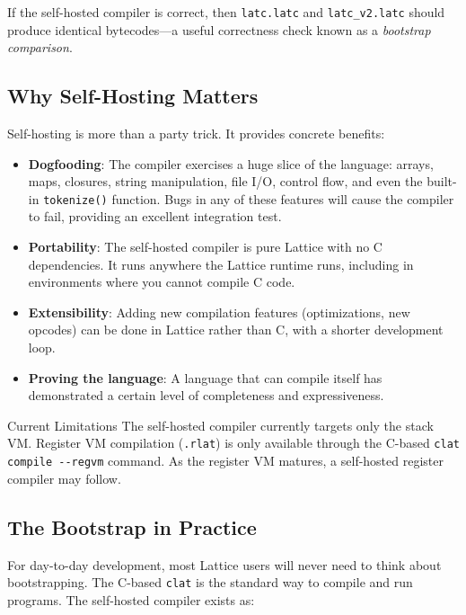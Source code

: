 If the self-hosted compiler is correct, then \lstinline|latc.latc| and \lstinline|latc_v2.latc| should produce identical bytecodes---a useful correctness check known as a \emph{bootstrap comparison}.

\subsection{Why Self-Hosting Matters}

Self-hosting is more than a party trick. It provides concrete benefits:

\begin{itemize}
  \item \textbf{Dogfooding}: The compiler exercises a huge slice of the language: arrays, maps, closures, string manipulation, file I/O, control flow, and even the built-in \lstinline|tokenize()| function. Bugs in any of these features will cause the compiler to fail, providing an excellent integration test.
  \item \textbf{Portability}: The self-hosted compiler is pure Lattice with no C dependencies. It runs anywhere the Lattice runtime runs, including in environments where you cannot compile C code.
  \item \textbf{Extensibility}: Adding new compilation features (optimizations, new opcodes) can be done in Lattice rather than C, with a shorter development loop.
  \item \textbf{Proving the language}: A language that can compile itself has demonstrated a certain level of completeness and expressiveness.
\end{itemize}

\begin{notebox}{Current Limitations}
The self-hosted compiler currently targets only the stack VM. Register VM compilation (\lstinline|.rlat|) is only available through the C-based \lstinline|clat compile --regvm| command. As the register VM matures, a self-hosted register compiler may follow.
\end{notebox}

\subsection{The Bootstrap in Practice}

For day-to-day development, most Lattice users will never need to think about bootstrapping. The C-based \lstinline|clat| is the standard way to compile and run programs. The self-hosted compiler exists as:

